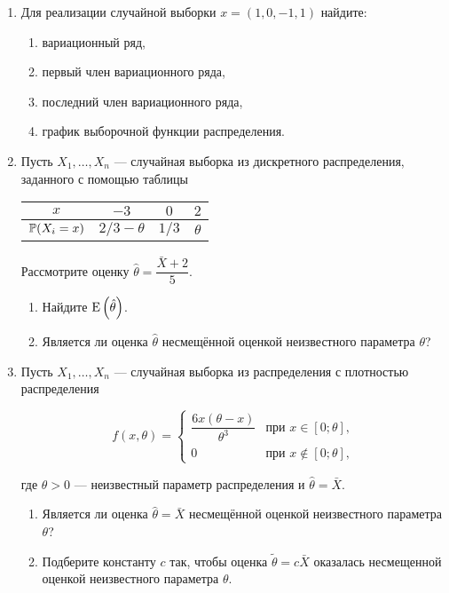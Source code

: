 \begin{enumerate}
\item Для реализации случайной выборки $x=(1, 0, -1, 1)$ найдите:

\begin{enumerate}
\item вариационный ряд,
\item первый член вариационного ряда,
\item последний член вариационного ряда,
\item график выборочной функции распределения.
\end{enumerate}

\item Пусть $X_1, \ldots, X_n$ — случайная выборка из дискретного распределения, заданного с помощью таблицы

\begin{center}
\begin{tabular}{cccc}
\toprule
 $x$ & $-3$  & $0$  & $2$  \\
 \midrule
 $\P(X_i = x)$ & $2/3 - \theta$ & $1/3$ & $\theta$ \\
 \bottomrule
\end{tabular}
\end{center}

Рассмотрите оценку $\hat{\theta} = \dfrac{\bar{X}+2}{5}$.

\begin{enumerate}
    \item Найдите $\E\left(\hat{\theta}\right)$.
    \item Является ли оценка $\hat{\theta}$ несмещённой оценкой неизвестного
		параметра $\theta$?
\end{enumerate}

\item Пусть $X_1, \ldots, X_n$ — случайная выборка из распределения
с плотностью распределения

\[
f(x,\theta) = \begin{cases}
\dfrac{6x(\theta - x)}{\theta^3} & \text{при } x \in [0;\theta], \\
0 & \text{при } x \not\in [0;\theta],
\end{cases}
\]

где $\theta > 0$ — неизвестный параметр распределения и $\hat{\theta} = \bar{X}$.

\begin{enumerate}
\item Является ли оценка $\hat{\theta} = \bar{X}$ несмещённой оценкой
неизвестного параметра $\theta$?
\item Подберите константу $c$ так, чтобы оценка $\tilde{\theta} = c\bar{X}$
оказалась несмещенной оценкой неизвестного параметра $\theta$.
\end{enumerate}


\end{enumerate}

